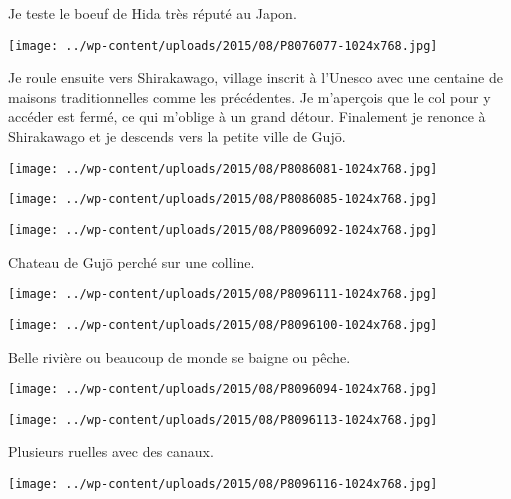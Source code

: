  \newline
 Je teste le boeuf de Hida très réputé au Japon. \newline
 \newline
\centerline{\texttt{[image: ../wp-content/uploads/2015/08/P8076077-1024x768.jpg]} } 
 \newline
 Je roule ensuite vers Shirakawago, village inscrit à l'Unesco avec une centaine de maisons traditionnelles comme les précédentes. Je m'aperçois que le col pour y accéder est fermé, ce qui m'oblige à un grand détour. Finalement je renonce à Shirakawago et je descends vers la petite ville de Gujō. \newline
 \newline
\centerline{\texttt{[image: ../wp-content/uploads/2015/08/P8086081-1024x768.jpg]} } 
 \newline
 \newline
\centerline{\texttt{[image: ../wp-content/uploads/2015/08/P8086085-1024x768.jpg]} } 
 \newline
 \newline
\centerline{\texttt{[image: ../wp-content/uploads/2015/08/P8096092-1024x768.jpg]} } 
 \newline
 Chateau de Gujō perché sur une colline. \newline
 \newline
\centerline{\texttt{[image: ../wp-content/uploads/2015/08/P8096111-1024x768.jpg]} } 
 \newline
 \newline
\centerline{\texttt{[image: ../wp-content/uploads/2015/08/P8096100-1024x768.jpg]} } 
 \newline
 Belle rivière ou beaucoup de monde se baigne ou pêche. \newline
 \newline
\centerline{\texttt{[image: ../wp-content/uploads/2015/08/P8096094-1024x768.jpg]} } 
 \newline
 \newline
\centerline{\texttt{[image: ../wp-content/uploads/2015/08/P8096113-1024x768.jpg]} } 
 \newline
 Plusieurs ruelles avec des canaux. \newline
 \newline
\centerline{\texttt{[image: ../wp-content/uploads/2015/08/P8096116-1024x768.jpg]} } 
 \newline
 \newline
